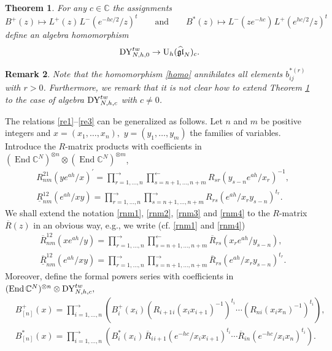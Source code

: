 \documentclass[12pt,a4paper,reqno]{amsart}
\theoremstyle{stil}
\newtheorem{thm}{Theorem}[section]
\theoremstyle{defi}
\theoremstyle{defi}
\newtheorem{rem}[thm]{Remark}
\theoremstyle{stil}
\theoremstyle{stil}
\theoremstyle{stil}
\theoremstyle{prim}
\newcommand{\wvr}{\overline}
\newcommand{\wndr}{\underline}
\newcommand{\Fand}{\qquad\text{and}\qquad}
\newcommand{\beq}{\begin{equation}}
\newcommand{\eeq}{\end{equation}}
\newcommand{\ot}{\otimes}
\newcommand{\ts}{\hspace{1pt}}
\newcommand{\ndo}{\mathop{\mathrm{End}}}
\newcommand{\R}{\wvr{R}}
\newcommand{\RRR}{\wndr{R}}
\newcommand{\RRRR}{\wndr{\wvr{R}}}
\newcommand{\uh}{{\rm U}_h (\widehat{\mathfrak{gl}}_N)_c}
\newcommand{\dyho}{{\rm DY}_{N,h,c}^{tw}  }
\newcommand{\dyhoz}{{\rm DY}_{N,h,0}^{tw}  }
\newcommand{\CC}{\mathbb{C}}
\begin{document}
\begin{thm}\label{pro_24}
For any $c\in\CC$ the assignments
$$
B^+(z)\mapsto L^+(z)\ts L^-(e^{-hc/2}/z)^t\Fand
B^*(z)\mapsto L^-(ze^{-hc })\ts L^+(e^{ hc/2 }/z)^t
$$
define an algebra homomorphism
\beq\label{homo}
\dyhoz \to \uh.
\eeq
\end{thm}

\begin{rem}
Note that the homomorphism \eqref{homo} annihilates all elements $b_{ij}^{*(r)}$ with $r>0 $. 
Furthermore, we remark that it is not clear how to extend Theorem \ref{pro_24}  to the case of algebra $\dyho$ with $c\neq 0$.
\end{rem}


 The   relations \eqref{re1}--\eqref{re3} can be generalized as follows. Let   $n$ and $m$  be positive integers  and  $x=(x_1,\ldots ,x_n), $   $y=(y_1,\ldots ,y_m)$ the families of variables. Introduce the $R$-matrix products with coefficients in $(\ndo\CC^N)^{\ot n} \ot (\ndo\CC^N)^{\ot m} $, 
\begin{align}
& R_{nm}^{21}(ye^{ah}/x)^\prime=
\prod_{r=1,\dots,n }^{\longrightarrow} \prod_{s=n+1,\dots,n+m }^{\longleftarrow}
R_{sr}( y_{s-n}e^{ah}/x_r)^{-1},\label{rnm3}\\
& \RRR_{nm}^{12}(e^{ah}/xy) =
\prod_{r=1,\dots,n }^{\longrightarrow} \prod_{s=n+1,\dots,n+m }^{\longrightarrow}
  R_{rs}(e^{ah}/x_r y_{s-n})^{t_r}.\label{rnm4}
\end{align}
We shall extend the notation \eqref{rnm1},  \eqref{rnm2},  \eqref{rnm3} and  \eqref{rnm4}   to the   $R$-matrix $\R(z)$ in an obvious way, e.g., we write (cf. \eqref{rnm1}  and  \eqref{rnm4})
\begin{align*}
& \R_{nm}^{12}(xe^{ah}/y)=
\prod_{r=1,\dots,n }^{\longrightarrow} \prod_{s=n+1,\dots,n+m }^{\longleftarrow}
\R_{rs}(x_r e^{ah} /y_{s-n}),\\
&\RRRR_{nm}^{12}(e^{ah}/xy) =
\prod_{r=1,\dots,n }^{\longrightarrow} \prod_{s=n+1,\dots,n+m }^{\longrightarrow}
 \R_{rs}(e^{ah}/x_r y_{s-n})^{t_r}.
\end{align*}
 Moreover, define  the formal powers series with coefficients in  $(\ndo\CC^N)^{\ot n} \ot \dyho,$
\begin{align}
& B^+_{[n]} (x) =\prod_{i=1,\ldots ,n }^{\longrightarrow}
\left(B^+_i (x_i)\left( R_{i+1\ts i}(x_i x_{i+1})^{-1}\right)^{t_i}\cdots
\left( R_{n  i}(x_i x_{n})^{-1}\right)^{t_i}\right),\label{nbplus}\\
& B^*_{[n]} (x) =\prod_{i=1,\ldots ,n }^{\longrightarrow}
\left(B^*_i (x_i)\ts \R_{ i\ts i+1}(e^{-hc}/x_i x_{i+1})^{t_i}\cdots
 \R_{  i n}(e^{-hc}/x_i x_{n}) ^{t_i}\right).\label{nbminus}
\end{align}
\end{document}
